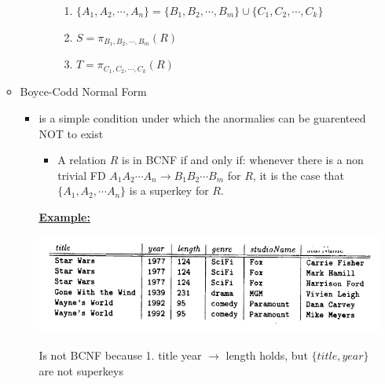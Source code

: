 \documentclass[12pt]{article}
\begin{document}
\begin{enumerate}[1.]
\begin{itemize}
\begin{itemize}
\begin{itemize}
                \bigskip

                \begin{enumerate}[1.]
                    \item $\{A_1, A_2, \cdots, A_n\} = \{B_1, B_2, \cdots, B_m\} \cup \{C_1,C_2, \cdots, C_k\}$
                    \item $S = \pi_{B_1, B_2, \cdots, B_m}(R)$
                    \item $T = \pi_{C_1, C_2, \cdots, C_k}(R)$
                \end{enumerate}

            \end{itemize}
        \end{itemize}

        \item Boyce-Codd Normal Form
        \begin{itemize}
            \item is a simple condition under which the anormalies can be
            guarenteed NOT to exist

            \bigskip

            \begin{itemize}
                \item A relation $R$ is in BCNF if and only if: whenever there is a
                non trivial FD $A_1A_2 \cdots A_n \to B_1 B_2 \cdots B_m$ for $R$,
                it is the case that $\{A_1, A_2, \cdots A_n\}$ is a superkey for $R$.
            \end{itemize}

            \bigskip

            \underline{\textbf{Example:}}

            \begin{center}
            \includegraphics[width=0.7\linewidth]{images/worksheet_12_solution_4.png}
            \end{center}

            \bigskip

            Is not BCNF because 1. title year $\to$ length holds, but $\{title, year\}$
            are not superkeys

            \bigskip


\end{itemize}
\end{itemize}
\end{enumerate}
\end{document}

